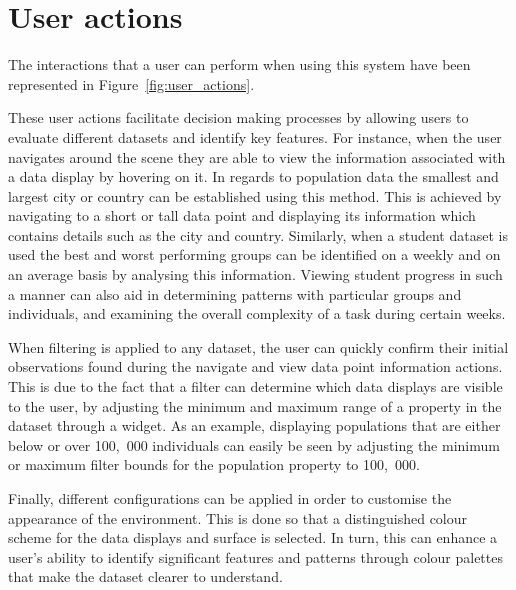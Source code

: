 \section{User actions} {
\label{sec:user_actions}

	The interactions that a user can perform when using this system have been represented in Figure~\ref{fig:user_actions}.

	

	These user actions facilitate decision making processes by allowing users to evaluate different datasets and identify key features. For instance, when the user navigates around the scene they are able to view the information associated with a data display by hovering on it. In regards to population data the smallest and largest city or country can be established using this method. This is achieved by navigating to a short or tall data point and displaying its information which contains details such as the city and country. Similarly, when a student dataset is used the best and worst performing groups can be identified on a weekly and on an average basis by analysing this information. Viewing student progress in such a manner can also aid in determining patterns with particular groups and individuals, and examining the overall complexity of a task during certain weeks. 

	When filtering is applied to any dataset, the user can quickly confirm their initial observations found during the navigate and view data point information actions. This is due to the fact that a filter can determine which data displays are visible to the user, by adjusting the minimum and maximum range of a property in the dataset through a widget. As an example, displaying populations that are either below or over 100,~000 individuals can easily be seen by adjusting the minimum or maximum filter bounds for the population property to 100,~000.

	Finally, different configurations can be applied in order to customise the appearance of the environment. This is done so that a distinguished colour scheme for the data displays and surface is selected. In turn, this can enhance a user's ability to identify significant features and patterns through colour palettes that make the dataset clearer to understand.

}

